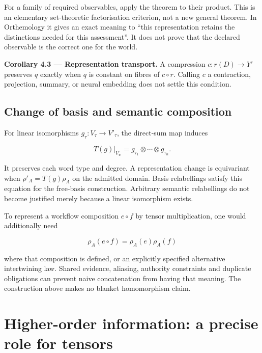 \documentclass[11pt,a4paper]{article}
\begin{document}
For a family of required observables, apply the theorem to their
product. This is an elementary set-theoretic factorisation criterion,
not a new general theorem. In Orthemology it gives an exact meaning to
``this representation retains the distinctions needed for this
assessment''. It does not prove that the declared observable is the
correct one for the world.


\textbf{Corollary 4.3 --- Representation transport.} A compression
\(c:r(D)\to Y'\) preserves \(q\) exactly when \(q\) is constant on
fibres of \(c\circ r\). Calling \(c\) a contraction, projection,
summary, or neural embedding does not settle this condition.

\subsection{Change of basis and semantic
composition}\label{change-of-basis-and-semantic-composition}

For linear isomorphisms \(g_\tau:V_\tau\to V'_\tau\), the direct-sum map
induces

\nopagebreak[4]

\[
T(g)|_{V_w}=g_{\tau_1}\otimes\cdots\otimes g_{\tau_n}.
\]

It preserves each word type and degree. A representation change is
equivariant when \(\rho'_A=T(g)\rho_A\) on the admitted domain. Basis
relabellings satisfy this equation for the free-basis construction.
Arbitrary semantic relabellings do not become justified merely because a
linear isomorphism exists.

To represent a workflow composition \(e\circ f\) by tensor
multiplication, one would additionally need

\nopagebreak[4]

\[\rho_A(e\circ f)=\rho_A(e)\rho_A(f)\]

where that composition is defined, or an explicitly specified
alternative intertwining law. Shared evidence, aliasing, authority
constraints and duplicate obligations can prevent naive concatenation
from having that meaning. The construction above makes no blanket
homomorphism claim.

\section{Higher-order information: a precise role for
tensors}\label{higher-order-information-a-precise-role-for-tensors}
\end{document}
